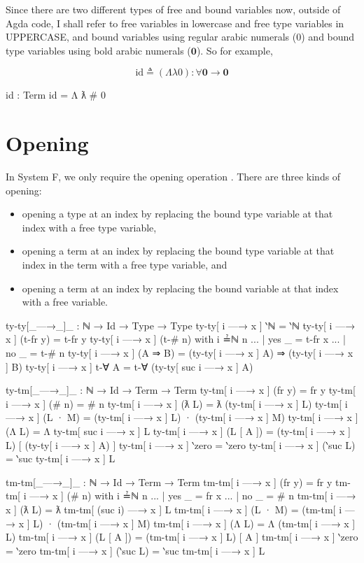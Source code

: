 \documentclass[logo,bsc,singlespacing,parskip,online]{infthesis}
\begin{document}
Since there are two different types of free and bound variables now, outside of Agda code, I shall
refer to free variables in lowercase and free type variables in UPPERCASE, and bound variables using
regular arabic numerals ($0$) and bound type variables using bold arabic numerals ($\mathbf{0}$). So
for example,

\begin{equation*}
  \text{id} \triangleq (\Lambda \lambda 0) \colon \forall \mathbf{0} \to \mathbf{0}
\end{equation*}
\begin{code}
  id : Term
  id = Λ ƛ # 0
\end{code}

\section{Opening}
In System F, we only require the opening operation \citep{chargueraud_locally_2012}. There are three
kinds of opening:
\begin{itemize}
  \item opening a type at an index by replacing the bound type variable at that index with a free
        type variable,
  \item opening a term at an index by replacing the bound type variable at that index in the term
        with a free type variable, and
  \item opening a term at an index by replacing the bound variable at that index with a free
        variable.
\end{itemize}

\begin{code}
  ty-ty[_—→_]_ : ℕ → Id → Type → Type
  ty-ty[ i —→ x ] ‵ℕ = ‵ℕ
  ty-ty[ i —→ x ] (t-fr y) = t-fr y
  ty-ty[ i —→ x ] (t-# n) with i ≟ℕ n
  ... | yes _ = t-fr x
  ... | no  _ = t-# n
  ty-ty[ i —→ x ] (A ⇒ B) = (ty-ty[ i —→ x ] A) ⇒ (ty-ty[ i —→ x ] B)
  ty-ty[ i —→ x ] t-∀ A = t-∀ (ty-ty[ suc i —→ x ] A)

  ty-tm[_—→_]_ : ℕ → Id → Term → Term
  ty-tm[ i —→ x ] (fr y) = fr y
  ty-tm[ i —→ x ] (# n) = # n
  ty-tm[ i —→ x ] (ƛ L) = ƛ (ty-tm[ i —→ x ] L)
  ty-tm[ i —→ x ] (L · M) = (ty-tm[ i —→ x ] L) · (ty-tm[ i —→ x ] M)
  ty-tm[ i —→ x ] (Λ L) = Λ ty-tm[ suc i —→ x ] L
  ty-tm[ i —→ x ] (L [ A ]) = (ty-tm[ i —→ x ] L) [ (ty-ty[ i —→ x ] A) ]
  ty-tm[ i —→ x ] ‵zero = ‵zero
  ty-tm[ i —→ x ] (‵suc L) = ‵suc ty-tm[ i —→ x ] L

  tm-tm[_—→_]_ : ℕ → Id → Term → Term
  tm-tm[ i —→ x ] (fr y) = fr y
  tm-tm[ i —→ x ] (# n) with i ≟ℕ n
  ... | yes _ = fr x
  ... | no  _ = # n
  tm-tm[ i —→ x ] (ƛ L) = ƛ tm-tm[ (suc i) —→ x ] L
  tm-tm[ i —→ x ] (L · M) =
    (tm-tm[ i —→ x ] L) · (tm-tm[ i —→ x ] M)
  tm-tm[ i —→ x ] (Λ L) = Λ (tm-tm[ i —→ x ] L)
  tm-tm[ i —→ x ] (L [ A ]) = (tm-tm[ i —→ x ] L) [ A ]
  tm-tm[ i —→ x ] ‵zero = ‵zero
  tm-tm[ i —→ x ] (‵suc L) = ‵suc tm-tm[ i —→ x ] L
\end{code}
\end{document}
